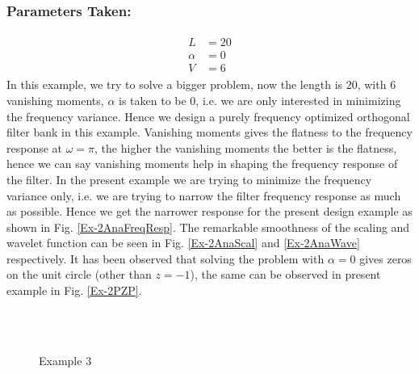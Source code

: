 \subsubsection{Parameters Taken:}
\begin{eqnarray*}
\begin{aligned}
L &= 20\\
\alpha &= 0\\
V &= 6
\end{aligned}
\end{eqnarray*}
In this example, we try to solve a bigger problem, now the length is $20$, with $6$ vanishing moments, $\alpha$ is taken to be $0$, i.e. we are only interested in minimizing the frequency variance. Hence we design a purely frequency optimized orthogonal filter bank in this example.  Vanishing moments gives the flatness to the frequency response at $\omega = \pi$, the higher the vanishing moments the better is the flatness, hence we can say vanishing moments help in shaping the frequency response of the filter. In the present example we are trying to minimize the frequency variance only, i.e. we are trying to narrow the filter frequency response as much as possible. Hence we get the narrower response for the present design example as shown in Fig. \ref{Ex-2AnaFreqResp}. The remarkable smoothness of the scaling and wavelet function can be seen in Fig. \ref{Ex-2AnaScal} and \ref{Ex-2AnaWave} respectively. It has been observed that solving the problem with $\alpha = 0$ gives zeros on the unit circle (other than $z=-1$), the same can be observed in present example in Fig. \ref{Ex-2PZP}.
\begin{figure*}
\centering
{}\\
\\
%
\caption{Example 3}
\label{Example 3}
\end{figure*}
